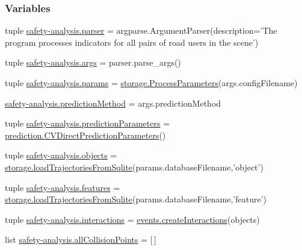 \subsubsection*{Variables}
\begin{DoxyCompactItemize}
\item 
tuple \hyperlink{namespacesafety-analysis_a77f1f12446258d158fe4c175f2e00c8a}{safety-\/analysis.\-parser} = argparse.\-Argument\-Parser(description='The program processes indicators for all pairs of road users in the scene')
\item 
tuple \hyperlink{namespacesafety-analysis_a9f08d35d57b8c8de45bf749f286a2583}{safety-\/analysis.\-args} = parser.\-parse\-\_\-args()
\item 
tuple \hyperlink{namespacesafety-analysis_a4cb92f5f2e336a81cd2d9dda6270e90c}{safety-\/analysis.\-params} = \hyperlink{classstorage_1_1ProcessParameters}{storage.\-Process\-Parameters}(args.\-config\-Filename)
\item 
\hyperlink{namespacesafety-analysis_af447253965234be3b5a97d6867eb3864}{safety-\/analysis.\-prediction\-Method} = args.\-prediction\-Method
\item 
tuple \hyperlink{namespacesafety-analysis_abff9643a4f33b02547c31562a8ca4fd3}{safety-\/analysis.\-prediction\-Parameters} = \hyperlink{classprediction_1_1CVDirectPredictionParameters}{prediction.\-C\-V\-Direct\-Prediction\-Parameters}()
\item 
tuple \hyperlink{namespacesafety-analysis_abe49e0670b51364da374434e6b2ba136}{safety-\/analysis.\-objects} = \hyperlink{namespacestorage_aaafba9f6bc0816ff0084df5e1d892a9d}{storage.\-load\-Trajectories\-From\-Sqlite}(params.\-database\-Filename,'object')
\item 
tuple \hyperlink{namespacesafety-analysis_ae9335dec1cbe36b77f4b7a9ad2c55220}{safety-\/analysis.\-features} = \hyperlink{namespacestorage_aaafba9f6bc0816ff0084df5e1d892a9d}{storage.\-load\-Trajectories\-From\-Sqlite}(params.\-database\-Filename,'feature')
\item 
tuple \hyperlink{namespacesafety-analysis_a5f62d113cdd0f010dea27ffeadbd4f80}{safety-\/analysis.\-interactions} = \hyperlink{namespaceevents_a6bb1ae1f6c4390259f31283b42e47226}{events.\-create\-Interactions}(objects)
\item 
list \hyperlink{namespacesafety-analysis_ab53934f4c9486b74c7246f4cd76cdadc}{safety-\/analysis.\-all\-Collision\-Points} = \mbox{[}$\,$\mbox{]}
\end{DoxyCompactItemize}
